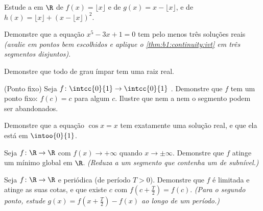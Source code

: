 \begin{exercise}[$\star$]\label{exo:b1:continuity:2}
Estude a  em $\R$ de $f(x) = \lfloor x \rfloor$ e de
$g(x) = x - \lfloor x \rfloor$, e de $h(x) = \lfloor x \rfloor +
(x - \lfloor x\rfloor)^2$.
\end{exercise}

\begin{exercise}[$\star$]\label{exo:b1:continuity:3}
Demonstre que a equação $x^5 - 3x + 1 = 0$ tem pelo menos três soluções
reais \emph{(avalie em pontos bem escolhidos e aplique o
\cref{thm:b1:continuity:ivt} em três segmentos disjuntos)}.
\end{exercise}

\begin{exercise}[$\star$]\label{exo:b1:continuity:4}
Demonstre que todo  de grau ímpar tem uma raiz real.
\end{exercise}

\begin{exercise}[$\star\star$]\label{exo:b1:continuity:5}
(Ponto fixo) Seja $f \colon \intcc{0}{1} \to \intcc{0}{1}$ .
Demonstre que $f$ tem um ponto fixo: $f(c) = c$ para algum
$c$. Ilustre que nem a  nem o segmento podem ser
abandonados.
\end{exercise}

\begin{exercise}[$\star\star$]\label{exo:b1:continuity:6}
Demonstre que a equação $\cos x = x$ tem exatamente uma solução real,
e que ela está em $\intoo{0}{1}$.
\end{exercise}

\begin{exercise}[$\star\star$]\label{exo:b1:continuity:7}
Seja $f \colon \R \to \R$  com $f(x) \to +\infty$ quando $x
\to \pm\infty$. Demonstre que $f$ atinge um mínimo global em $\R$.
\emph{(Reduza a um segmento que contenha um  de subnível.)}
\end{exercise}

\begin{exercise}[$\star\star$]\label{exo:b1:continuity:8}
Seja $f \colon \R \to \R$  e periódica (de período $T >
0$). Demonstre que $f$ é limitada e atinge as suas cotas, e que existe
$c$ com $f(c + \frac T2) = f(c)$. \emph{(Para o segundo
ponto, estude $g(x) = f(x + \frac T2) - f(x)$ ao longo de um período.)}
\end{exercise}

